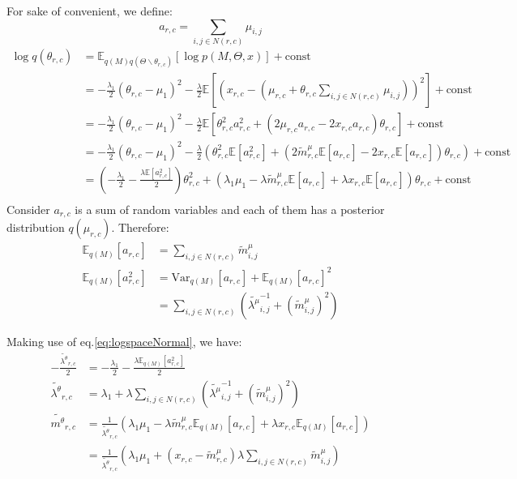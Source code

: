 \documentclass[12pt]{article}
\newenvironment{problem}[2][Problem]{\begin{trivlist}
\item[\hskip \labelsep {\bfseries #1}\hskip \labelsep {\bfseries #2.}]}{\end{trivlist}}
\begin{document}
\begin{problem}{2.9.25}
For sake of convenient, we define:
\begin{equation}
    a_{r,c} = \sum_{i,j \in N(r,c)}\mu_{i,j}
\end{equation}
\begin{align*}
    \log q(\theta_{r,c}) &= 
        \mathbb{E}_{q(M)q(\Theta\backslash\theta_{r,c})}[\log p(M, \Theta, x)] 
        + \text{const} \\
    &= -\frac{\lambda_1}{2}(\theta_{r,c} - \mu_1)^2
    -\frac{\lambda}{2}\mathbb{E}[(x_{r,c} - (\mu_{r,c} + \theta_{r,c}\sum_{i,j \in N(r,c)}\mu_{i,j}))^2]
    + \text{const} \\
    &= -\frac{\lambda_1}{2}(\theta_{r,c} - \mu_1)^2
    -\frac{\lambda}{2}\mathbb{E}[\theta^2_{r,c}a_{r,c}^2 + (2\mu_{r,c}a_{r,c} - 2x_{r,c}a_{r,c})\theta_{r,c}]
    + \text{const} \\
    &=-\frac{\lambda_1}{2}(\theta_{r,c} - \mu_1)^2  
    -\frac{\lambda}{2}(\theta^2_{r,c}\mathbb{E}[a_{r,c}^2] 
            + (2\tilde{m}^{\mu}_{r,c}\mathbb{E}[a_{r,c}] - 2x_{r,c}\mathbb{E}[a_{r,c}])\theta_{r,c})
    + \text{const} \\
    &= (-\frac{\lambda_1}{2} -\frac{\lambda\mathbb{E}[a_{r,c}^2]}{2})\theta_{r,c}^2 
    + (\lambda_1\mu_1 - \lambda\tilde{m}^{\mu}_{r,c}\mathbb{E}[a_{r,c}] + \lambda x_{r,c}\mathbb{E}[a_{r,c}])\theta_{r,c}
    + \text{const} \\
\end{align*}
Consider $a_{r,c}$ is a sum of random variables and each of them has a posterior distribution $q(\mu_{r,c})$. 
Therefore:
\begin{align*}
    \mathbb{E}_{q(M)}[a_{r,c}] &= \sum_{i,j \in N(r,c)}\tilde{m}^{\mu}_{i,j} \\
    \mathbb{E}_{q(M)}[a_{r,c}^2] &= \mathrm{Var}_{q(M)}[a_{r,c}] + \mathbb{E}_{q(M)}[a_{r,c}]^2 \\
    &= \sum_{i,j \in N(r,c)}(\tilde{\lambda^{\mu}}^{-1}_{i,j} + (\tilde{m}^{\mu}_{i,j})^2)
\end{align*}

Making use of eq.\eqref{eq:logspaceNormal}, we have:
\begin{align*}
    -\frac{\tilde{\lambda^{\theta}}_{r,c}}{2} 
    &= -\frac{\lambda_1}{2} -\frac{\lambda\mathbb{E}_{q(M)}[a_{r,c}^2]}{2} \\
    \tilde{\lambda^{\theta}}_{r,c}
    &= \lambda_1 + \lambda\sum_{i,j \in N(r,c)}(\tilde{\lambda^{\mu}}^{-1}_{i,j} + (\tilde{m}^{\mu}_{i,j})^2) \\
    \tilde{m^{\theta}}_{r,c} 
    &= \frac{1}{\tilde{\lambda^{\theta}}_{r,c}}
    (\lambda_1\mu_1 - \lambda\tilde{m}^{\mu}_{r,c}\mathbb{E}_{q(M)}[a_{r,c}] + \lambda x_{r,c}\mathbb{E}_{q(M)}[a_{r,c}]) \\
    &= \frac{1}{\tilde{\lambda^{\theta}}_{r,c}}
    (\lambda_1\mu_1 + (x_{r,c} - \tilde{m}^{\mu}_{r,c})\lambda\sum_{i,j \in N(r,c)}\tilde{m}^{\mu}_{i,j})
\end{align*}


\end{problem}
\end{document}
